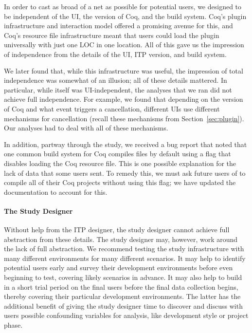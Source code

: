 In order to cast as broad of a net as possible for potential users, we
designed \toolname to be independent of the UI, 
the version of Coq, and the build system. Coq's plugin infrastructure
and interaction model offered a promising avenue for this,
and Coq's resource file infrastructure meant that users could load the plugin
universally with just one LOC in one location.
All of this gave us the impression of independence from the details of
the UI, ITP version, and build system.

We later found that, while this infrastructure was useful,
the impression of total independence was somewhat of an illusion; 
all of these details mattered.
In particular, while \toolname itself was UI-independent, the analyses
that we ran did not achieve full independence.
For example, we found that depending on the version of Coq and what
event triggers a cancellation, different UIs use different mechanisms
for cancellation (recall these mechanisms from Section~\ref{sec:plugin}). 
Our analyses had to deal with all of these mechanisms.

In addition, partway through the study, we received a bug 
report that noted that one common build system for Coq compiles files by
default using a flag that disables loading the Coq resource file.
This is one possible explanation for the lack of data that some users sent.
To remedy this, we must ask future users of \toolname
to compile all of their Coq projects without using this flag;
we have updated the \toolname documentation to account for this. 

\paragraph{The Study Designer} Without help from the ITP designer,
the study designer cannot achieve full abstraction from these details.
The study designer may, however, work around the lack of full abstraction.
We recommend testing the study infrastructure with 
many different environments for many different scenarios.
It may help to identify potential users early and survey their
development environments before even beginning to test,
covering likely scenarios in advance.
It may also help to build in a short trial period on the final users
before the final data collection begins, thereby
covering their particular development environments.
The latter has the additional benefit of giving the study designer
time to discover and discuss with users possible confounding
variables for analysis, like development style or project phase.

